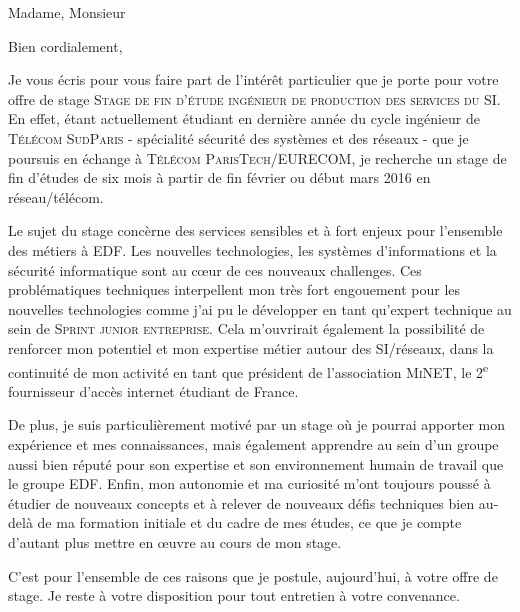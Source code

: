 \documentclass[10pt,a4paper,roman]{moderncv} %
\begin{document}
\date{16 Novembre 2015} %
\opening{Madame, Monsieur} %

\closing{Bien cordialement,} %


\makelettertitle %


\quad \quad Je vous écris pour vous faire part de l'intérêt particulier que je porte pour votre offre de stage
\textsc{Stage de fin d'étude ingénieur de production des services du SI}. En effet, étant actuellement étudiant en dernière année du cycle
ingénieur de \textsc{Télécom SudParis} - spécialité sécurité des systèmes et des réseaux - que je poursuis en échange à
\textsc{Télécom ParisTech}/\textsc{EURECOM}, je recherche un stage de fin d’études de six mois à partir  de fin février ou début mars 2016 en réseau/télécom.

\quad \quad Le sujet du stage concèrne des services sensibles et à fort enjeux pour l'ensemble des métiers à EDF. Les nouvelles technologies,
les systèmes d’informations et la sécurité informatique sont au c\oe ur de ces nouveaux challenges. Ces problématiques techniques interpellent mon très
fort engouement pour les nouvelles technologies comme j'ai pu le
développer en tant qu'expert technique au sein de \textsc{Sprint junior entreprise}. Cela m'ouvrirait également la possibilité de renforcer mon
potentiel et mon expertise métier autour des SI/réseaux, dans la continuité de mon activité en tant que président de l'association \textsc{MiNET},
le 2\textsuperscript{e} fournisseur d'accès internet étudiant de France.

\quad \quad De plus, je suis particulièrement motivé par un stage où je pourrai apporter mon expérience et mes connaissances, mais également
apprendre au sein d'un groupe aussi bien réputé pour son expertise et son environnement humain de travail que le groupe \textsc{EDF}.
Enfin, mon autonomie et ma curiosité m'ont toujours poussé à étudier de nouveaux concepts et à relever de nouveaux défis techniques bien au-delà de ma
formation initiale et du cadre de mes études, ce que je compte d'autant plus mettre en \oe uvre au cours de mon stage.

\quad \quad C’est pour l’ensemble de ces raisons que je postule, aujourd'hui, à votre offre de stage. Je reste à votre disposition pour
tout entretien à votre convenance.
\\[0.7cm]


\makeletterclosing %

\end{document}
